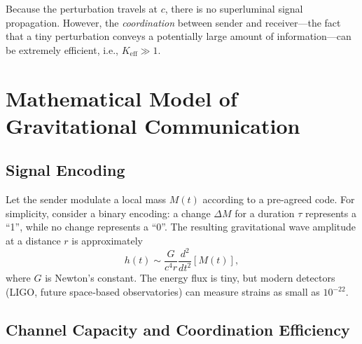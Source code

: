 \documentclass[12pt,a4paper]{article}
\newcommand{\Keff}{K_{\mathrm{eff}}}
\begin{document}
	Because the perturbation travels at \(c\), there is no superluminal signal propagation. However, the \emph{coordination} between sender and receiver—the fact that a tiny perturbation conveys a potentially large amount of information—can be extremely efficient, i.e., \(\Keff \gg 1\).
	
	\section{Mathematical Model of Gravitational Communication}
	\label{sec:model}
	
	\subsection{Signal Encoding}
	
	Let the sender modulate a local mass \(M(t)\) according to a pre‑agreed code. For simplicity, consider a binary encoding: a change \(\Delta M\) for a duration \(\tau\) represents a “1”, while no change represents a “0”. The resulting gravitational wave amplitude at a distance \(r\) is approximately
	\begin{equation}
		h(t) \sim \frac{G}{c^4 r} \frac{d^2}{dt^2} \left[ M(t) \right],
	\end{equation}
	where \(G\) is Newton’s constant. The energy flux is tiny, but modern detectors (LIGO, future space‑based observatories) can measure strains as small as \(10^{-22}\).
	
	\subsection{Channel Capacity and Coordination Efficiency}
	
\end{document}
